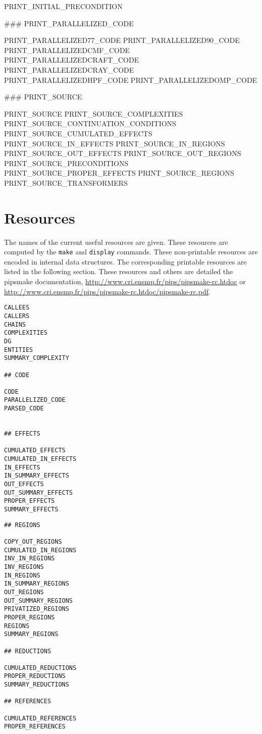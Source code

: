 \documentclass[a4paper]{article}
\newcommand{\PipsPIPSmakePDF}{\url{http://www.cri.ensmp.fr/pips/pipsmake-rc.htdoc/pipsmake-rc.pdf}\xspace}
\newcommand{\PipsPIPSmakeHTDOC}{\url{http://www.cri.ensmp.fr/pips/pipsmake-rc.htdoc}\xspace}
\begin{document}
\begin{verbatim*}
PRINT_INITIAL_PRECONDITION

### PRINT_PARALLELIZED_CODE

PRINT_PARALLELIZED77_CODE
PRINT_PARALLELIZED90_CODE
PRINT_PARALLELIZEDCMF_CODE
PRINT_PARALLELIZEDCRAFT_CODE
PRINT_PARALLELIZEDCRAY_CODE
PRINT_PARALLELIZEDHPF_CODE
PRINT_PARALLELIZEDOMP_CODE

### PRINT_SOURCE

PRINT_SOURCE
PRINT_SOURCE_COMPLEXITIES
PRINT_SOURCE_CONTINUATION_CONDITIONS
PRINT_SOURCE_CUMULATED_EFFECTS
PRINT_SOURCE_IN_EFFECTS
PRINT_SOURCE_IN_REGIONS
PRINT_SOURCE_OUT_EFFECTS
PRINT_SOURCE_OUT_REGIONS
PRINT_SOURCE_PRECONDITIONS
PRINT_SOURCE_PROPER_EFFECTS
PRINT_SOURCE_REGIONS
PRINT_SOURCE_TRANSFORMERS
\end{verbatim*}


\section{Resources}
\label{res}

The names of the current useful resources are given. These resources are
computed by the \verb+make+ and \verb+display+ commands. These
non-printable resources are encoded in internal data structures. The
corresponding printable resources are listed in the following section.
These resources and others are detailed the pipsmake documentation,
\PipsPIPSmakeHTDOC or \PipsPIPSmakePDF.

\begin{verbatim}
CALLEES
CALLERS
CHAINS  
COMPLEXITIES  
DG      
ENTITIES 
SUMMARY_COMPLEXITY

## CODE 

CODE  
PARALLELIZED_CODE
PARSED_CODE


## EFFECTS

CUMULATED_EFFECTS
CUMULATED_IN_EFFECTS
IN_EFFECTS
IN_SUMMARY_EFFECTS
OUT_EFFECTS
OUT_SUMMARY_EFFECTS
PROPER_EFFECTS
SUMMARY_EFFECTS
\end{verbatim}

\begin{verbatim}
## REGIONS
 
COPY_OUT_REGIONS                        
CUMULATED_IN_REGIONS                    
INV_IN_REGIONS                          
INV_REGIONS                             
IN_REGIONS
IN_SUMMARY_REGIONS
OUT_REGIONS
OUT_SUMMARY_REGIONS
PRIVATIZED_REGIONS
PROPER_REGIONS
REGIONS 
SUMMARY_REGIONS

## REDUCTIONS 

CUMULATED_REDUCTIONS                    
PROPER_REDUCTIONS
SUMMARY_REDUCTIONS

## REFERENCES

CUMULATED_REFERENCES                    
PROPER_REFERENCES
\end{verbatim}
\end{document}
